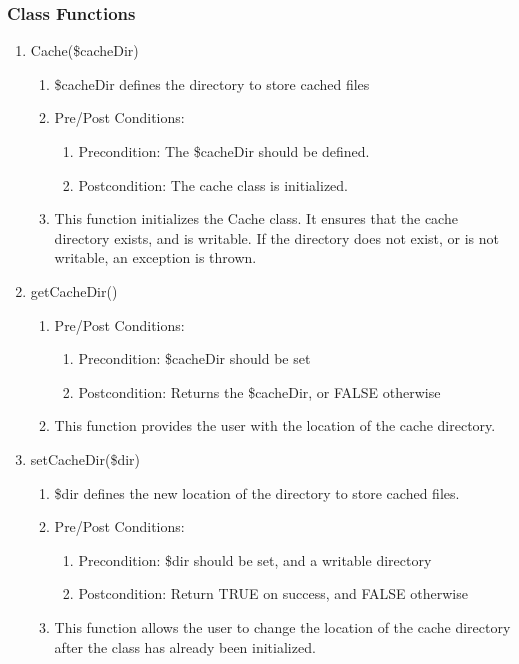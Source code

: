 \documentclass{article}
\begin{document}
\subsubsection{Class Functions}
\begin{enumerate}
\item Cache(\$cacheDir)
\begin{enumerate}
\item \$cacheDir defines the directory to store cached files
\item Pre/Post Conditions:
\begin{enumerate}
\item Precondition: The \$cacheDir should be defined.
\item Postcondition: The cache class is initialized.
\end{enumerate}
\item This function initializes the Cache class. It ensures that the cache directory exists, and is writable. If the directory does not exist, or is not writable, an exception is thrown.
\end{enumerate}
\item getCacheDir()
\begin{enumerate}
\item Pre/Post Conditions:
\begin{enumerate}
\item Precondition: \$cacheDir should be set
\item Postcondition: Returns the \$cacheDir, or FALSE otherwise
\end{enumerate}
\item This function provides the user with the location of the cache directory.
\end{enumerate}
\item setCacheDir(\$dir)
\begin{enumerate}
\item \$dir defines the new location of the directory to store cached files.
\item Pre/Post Conditions:
\begin{enumerate}
\item Precondition: \$dir should be set, and a writable directory
\item Postcondition: Return TRUE on success, and FALSE otherwise
\end{enumerate}
\item This function allows the user to change the location of the cache directory after the class has already been initialized.
\end{enumerate}

\end{enumerate}
\end{document}
